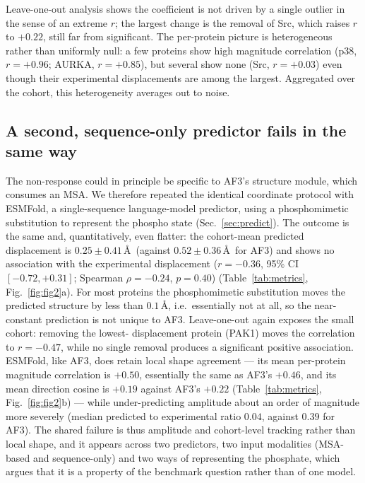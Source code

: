 Leave-one-out analysis shows the coefficient is not driven by a single
outlier in the sense of an extreme $r$; the largest change is the removal
of Src, which raises $r$ to $+0.22$, still far from significant. The
per-protein picture is heterogeneous rather than uniformly null: a few
proteins show high magnitude correlation (p38, $r=+0.96$; AURKA,
$r=+0.85$), but several show none (Src, $r=+0.03$) even though their
experimental displacements are among the largest. Aggregated over the
cohort, this heterogeneity averages out to noise.

\subsection{A second, sequence-only predictor fails in the same way}
\label{sec:res-esm}

The non-response could in principle be specific to AF3's structure module,
which consumes an MSA. We therefore repeated the identical coordinate
protocol with ESMFold, a single-sequence language-model predictor, using a
phosphomimetic substitution to represent the phospho state
(Sec.~\ref{sec:predict}). The outcome is the same and, quantitatively,
even flatter: the cohort-mean predicted displacement is
$0.25\pm0.41$\,\AA\ (against $0.52\pm0.36$\,\AA\ for AF3) and shows no
association with the experimental displacement ($r=-0.36$, 95\% CI
$[-0.72,+0.31]$; Spearman $\rho=-0.24$, $p=0.40$) (Table~\ref{tab:metrics},
Fig.~\ref{fig:fig2}a). For most proteins the phosphomimetic substitution
moves the predicted structure by less than $0.1$\,\AA, i.e.\ essentially
not at all, so the near-constant prediction is not unique to AF3.
Leave-one-out again exposes the small cohort: removing the lowest-
displacement protein (PAK1) moves the correlation to $r=-0.47$, while no
single removal produces a significant positive association. ESMFold, like
AF3, does retain local shape agreement --- its mean per-protein magnitude
correlation is $+0.50$, essentially the same as AF3's $+0.46$, and its mean
direction cosine is $+0.19$ against AF3's $+0.22$
(Table~\ref{tab:metrics}, Fig.~\ref{fig:fig2}b) --- while under-predicting
amplitude about an order of magnitude more severely (median predicted to
experimental ratio $0.04$, against $0.39$ for AF3). The shared failure is
thus amplitude and cohort-level tracking rather than local shape, and it
appears across two predictors, two input modalities (MSA-based and
sequence-only) and two ways of representing the phosphate, which argues
that it is a property of the benchmark question rather than of one model.


